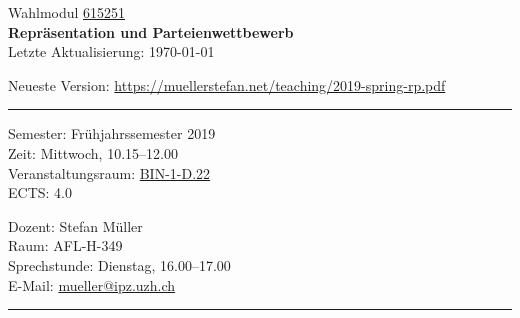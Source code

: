 \documentclass[abstract=on,parskip=full,headings=standardclasses,fontsize=11pt,paper=a4]{scrartcl}
\begin{document}
	
\singlespacing


\noindent
{}%
\hfill%

\singlespacing
\vspace{1cm}

\begin{center}
{\large Wahlmodul \href{https://studentservices.uzh.ch/uzh/anonym/vvz/index.html#/details/2018/004/E/50926420}{615251}} \\ 
\medskip
{\Large \textbf{Repräsentation und Parteienwettbewerb}} \\
\bigskip
{\large  Letzte Aktualisierung: \today}

Neueste Version: \url{https://muellerstefan.net/teaching/2019-spring-rp.pdf}
\end{center}

\vspace{1.5cm}

\hrule
\medskip
\begin{minipage}[t]{0.5\textwidth}
Semester: Frühjahrssemester 2019 \\
Zeit: Mittwoch, 10.15--12.00 \\
Veranstaltungsraum:  \href{https://www.plaene.uzh.ch/BIN}{BIN-1-D.22} \\
ECTS: 4.0
\end{minipage}
\begin{minipage}[t]{0.49\textwidth}
\begin{flushright}
Dozent: Stefan Müller \\
Raum: AFL-H-349\\
Sprechstunde: Dienstag, 16.00--17.00 \\
E-Mail: \textsf{\href{mailto:mueller@ipz.uzh.ch}{mueller@ipz.uzh.ch}}
\end{flushright}
\end{minipage}
\medskip
\vspace{2.5mm}
\hrule 
\end{document}
